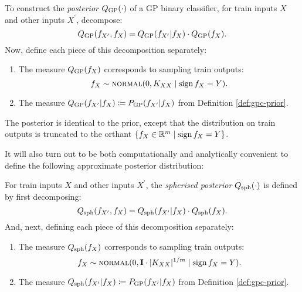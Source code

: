 \begin{refsection}
\begin{definition}\label{def:gpc-posterior}
To construct the \textit{posterior} $Q_\mathrm{GP}(\cdot)$ of a GP binary classifier, for train inputs $X$ and other inputs $X^\prime$, decompose:
\begin{equation}
    Q_\mathrm{GP}(f_{X^\prime}, f_X) = Q_\mathrm{GP}(f_{X^\prime}|f_X) \cdot Q_\mathrm{GP}(f_X).
\end{equation}
Now, define each piece of this decomposition separately:
\begin{enumerate}
    \item The measure $Q_\mathrm{GP}(f_X)$ corresponds to sampling train outputs:
    \begin{equation}
        f_X \sim \textsc{normal}(0,K_{XX}\mid\operatorname{sign} f_X = Y).
    \end{equation}
    \item The measure $Q_\mathrm{GP}(f_{X^\prime}|f_X) \coloneqq P_\mathrm{GP}(f_{X^\prime}|f_X)$ from Definition \ref{def:gpc-prior}.
\end{enumerate}
\end{definition}
The posterior is identical to the prior, except that the distribution on train outputs is truncated to the orthant $\{f_X \in \mathbb{R}^m \mid \operatorname{sign} f_X = Y\}$. 

It will also turn out to be both computationally and analytically convenient to define the following approximate posterior distribution:

\begin{definition}\label{def:gpc-posterior-spherised}
For train inputs $X$ and other inputs $X^\prime$, the \textit{spherised posterior} $Q_\mathrm{sph}(\cdot)$ is defined by first decomposing:
\begin{equation}
    Q_\mathrm{sph}(f_{X^\prime}, f_X) = Q_\mathrm{sph}(f_{X^\prime}|f_X) \cdot Q_\mathrm{sph}(f_X).
\end{equation}
And, next, defining each piece of this decomposition separately:
\begin{enumerate}
    \item The measure $Q_\mathrm{sph}(f_X)$ corresponds to sampling train outputs:
    \begin{equation}
        f_X \sim \textsc{normal}(0,\mathbf{I}\cdot \vert {K_{XX}} \vert^{1/m}\mid\operatorname{sign} f_X = Y).
    \end{equation}
    \item The measure $Q_\mathrm{sph}(f_{X^\prime}|f_X) \coloneqq P_\mathrm{GP}(f_{X^\prime}|f_X)$ from Definition \ref{def:gpc-prior}.
\end{enumerate}
\end{definition}


\end{refsection}
